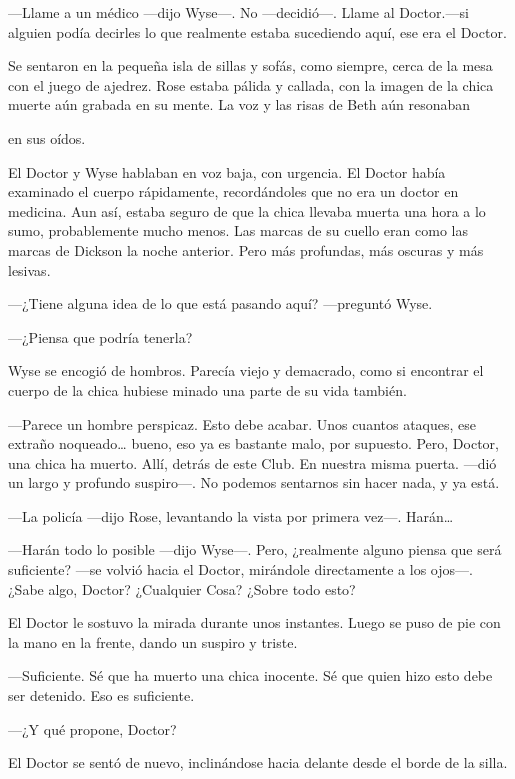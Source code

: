 {---Llame a un médico ---dijo Wyse---. No ---decidió---. Llame al
	Doctor.---si alguien podía decirles lo que realmente estaba sucediendo
aquí, ese era el Doctor.}

{Se sentaron en la pequeña isla de sillas y sofás, como siempre, cerca
	de la mesa con el juego de ajedrez. Rose estaba pálida y callada, con la
	imagen de la chica muerte aún grabada en su mente. La voz y las risas de
Beth aún resonaban}

{en sus oídos.}

{El Doctor y Wyse hablaban en voz baja, con urgencia. El Doctor había
	examinado el cuerpo rápidamente, recordándoles que no era un doctor en
	medicina. Aun así, estaba seguro de que la chica llevaba muerta una hora
	a lo sumo, probablemente mucho menos. Las marcas de su cuello eran como
	las marcas de Dickson la noche anterior. Pero más profundas, más oscuras
y más lesivas.}

{---¿Tiene alguna idea de lo que está pasando aquí? ---preguntó Wyse.}

{---¿Piensa que podría tenerla?}

{Wyse se encogió de hombros. Parecía viejo y demacrado, como si
	encontrar el cuerpo de la chica hubiese minado una parte de su vida
también.}

{---Parece un hombre perspicaz. Esto debe acabar. Unos cuantos ataques,
	ese extraño noqueado\ldots{} bueno, eso ya es bastante malo, por
	supuesto. Pero, Doctor, una chica ha muerto. Allí, detrás de este Club.
	En nuestra misma puerta. ---dió un largo y profundo suspiro---. No
podemos sentarnos sin hacer nada, y ya está.}

{---La policía ---dijo Rose, levantando la vista por primera vez---.
	Harán\ldots{}}

{---Harán todo lo posible ---dijo Wyse---. Pero, ¿realmente alguno
	piensa que será suficiente? ---se volvió hacia el Doctor, mirándole
	directamente a los ojos---. ¿Sabe algo, Doctor? ¿Cualquier Cosa?
¿Sobre todo esto?}

{El Doctor le sostuvo la mirada durante unos instantes. Luego se puso de
pie con la mano en la frente, dando un suspiro y triste.}

{---Suficiente. Sé que ha muerto una chica inocente. Sé que quien hizo
esto debe ser detenido. Eso es suficiente.}

{---¿Y qué propone, Doctor?}

{El Doctor se sentó de nuevo, inclinándose hacia delante desde el borde
de la silla.}

